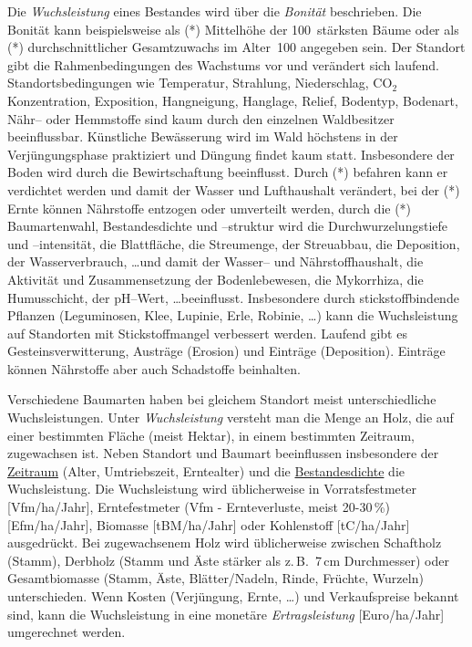 \documentclass[twocolumn]{scrartcl}
\begin{document}
Die \emph{Wuchsleistung} eines Bestandes wird über die \emph{Bonität}
beschrieben. Die Bonität kann beispielsweise als (*) Mittelhöhe der
100~stärksten Bäume oder als (*) durchschnittlicher Gesamtzuwachs im Alter~100
angegeben sein. Der Standort gibt die Rahmenbedingungen des Wachstums vor und
verändert sich laufend. Standortsbedingungen wie Temperatur, Strahlung,
Niederschlag, CO$_2$ Konzentration, Exposition, Hangneigung, Hanglage, Relief,
Bodentyp, Bodenart, Nähr-- oder Hemmstoffe sind kaum durch den einzelnen
Waldbesitzer beeinflussbar. Künstliche Bewässerung wird im Wald höchstens in der
Verjüngungsphase praktiziert und Düngung findet kaum statt. Insbesondere der
Boden wird durch die Bewirtschaftung beeinflusst. Durch (*) befahren kann er
verdichtet werden und damit der Wasser und Lufthaushalt verändert, bei der (*)
Ernte können Nährstoffe entzogen oder umverteilt werden, durch die (*)
Baumartenwahl, Bestandesdichte und --struktur wird die Durchwurzelungstiefe und
--intensität, die Blattfläche, die Streumenge, der Streuabbau, die Deposition,
der Wasserverbrauch, \dots und damit der Wasser-- und Nährstoffhaushalt, die
Aktivität und Zusammensetzung der Bodenlebewesen, die Mykorrhiza, die
Humusschicht, der pH--Wert, \dots beeinflusst. Insbesondere durch
stickstoffbindende Pflanzen (Leguminosen, Klee, Lupinie, Erle, Robinie, \dots)
kann die Wuchsleistung auf Standorten mit Stickstoffmangel verbessert werden.
Laufend gibt es Gesteinsverwitterung, Austräge (Erosion) und Einträge
(Deposition). Einträge können Nährstoffe aber auch Schadstoffe beinhalten.

Verschiedene Baumarten haben bei gleichem Standort meist unterschiedliche
Wuchsleistungen. Unter \emph{Wuchsleistung} versteht man die Menge an Holz, die
auf einer bestimmten Fläche (meist Hektar), in einem bestimmten Zeitraum,
zugewachsen ist. Neben Standort und Baumart beeinflussen insbesondere der
\hyperref[sec:AlterUndErntezeitpunkt]{Zeitraum} (Alter, Umtriebszeit,
Erntealter) und die \hyperref[sec:StammzahlUndBestandesdichte]{Bestandesdichte}
die Wuchsleistung. Die Wuchsleistung wird üblicherweise in Vorratsfestmeter
[Vfm/ha/Jahr], Erntefestmeter (Vfm - Ernteverluste, meist 20-30\,\%)
[Efm/ha/Jahr], Biomasse [tBM/ha/Jahr] oder Kohlenstoff [tC/ha/Jahr] ausgedrückt.
Bei zugewachsenem Holz wird üblicherweise zwischen Schaftholz (Stamm), Derbholz
(Stamm und Äste stärker als z.\,B.\ 7\,cm Durchmesser) oder Gesamtbiomasse
(Stamm, Äste, Blätter/Nadeln, Rinde, Früchte, Wurzeln) unterschieden. Wenn
Kosten (Verjüngung, Ernte, \dots) und Verkaufspreise bekannt sind, kann die
Wuchsleistung in eine monetäre \emph{Ertragsleistung} [Euro/ha/Jahr] umgerechnet
werden.
\end{document}
